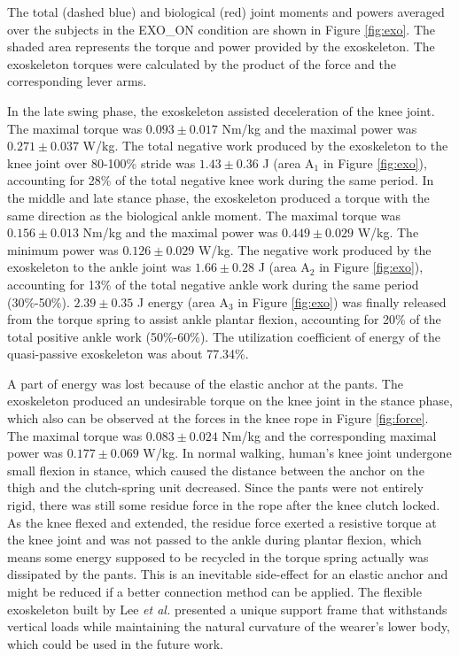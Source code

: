 \documentclass[twocolumn,cleanfoot,10pt]{asme2ej}
\begin{document}
The total (dashed blue) and biological (red) joint moments and powers averaged over the subjects in the EXO\_ON condition are shown in Figure \ref{fig:exo}. The shaded area represents the torque and power provided by the exoskeleton. The exoskeleton torques were calculated by the product of the force and the corresponding lever arms. 

In the late swing phase, the exoskeleton assisted deceleration of the knee joint. The maximal torque was $0.093\pm0.017$ Nm/kg and the maximal power was $0.271\pm0.037$ W/kg. The total negative work produced by the exoskeleton to the knee joint over 80-100\% stride was $1.43\pm0.36$ J (area A$_{1}$ in Figure \ref{fig:exo}), accounting for 28\% of the total negative knee work during the same period. In the middle and late stance phase, the exoskeleton produced a torque with the same direction as the biological ankle moment. The maximal torque was $0.156\pm0.013$ Nm/kg and the maximal power was $0.449\pm0.029$ W/kg. The minimum power was $0.126\pm0.029$ W/kg. The negative work produced by the exoskeleton to the ankle joint was $1.66\pm0.28$ J (area A$_{2}$ in Figure \ref{fig:exo}), accounting for 13\% of the total negative ankle work during the same period (30\%-50\%). $2.39\pm0.35$ J energy (area A$_{3}$ in Figure \ref{fig:exo}) was finally released from the torque spring to assist ankle plantar flexion, accounting for 20\% of the total positive ankle work (50\%-60\%). The utilization coefficient of energy of the quasi-passive exoskeleton was about 77.34\%.

A part of energy was lost because of the elastic anchor at the pants. The exoskeleton produced an undesirable torque on the knee joint in the stance phase, which also can be observed at the forces in the knee rope in Figure \ref{fig:force}. The maximal torque was $0.083\pm0.024$ Nm/kg and the corresponding maximal power was $0.177\pm0.069$ W/kg. In normal walking, human’s knee joint undergone small flexion in stance, which caused the distance between the anchor on the thigh and the clutch-spring unit decreased. Since the pants were not entirely rigid, there was still some residue force in the rope after the knee clutch locked. As the knee flexed and extended, the residue force exerted a resistive torque at the knee joint and was not passed to the ankle during plantar flexion, which means some energy supposed to be recycled in the torque spring actually was dissipated by the pants. This is an inevitable side-effect for an elastic anchor and might be reduced if a better connection method can be applied. The flexible exoskeleton built by Lee \emph{et al.} \cite{exosuit} presented a unique support frame that withstands vertical loads while maintaining the natural curvature of the wearer's lower body, which could be used in the future work.
\end{document}
